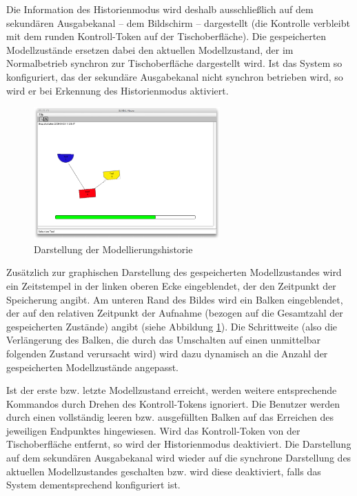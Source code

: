 Die Information des Historienmodus wird deshalb ausschließlich auf dem sekundären Ausgabekanal -- dem Bildschirm -- dargestellt (die Kontrolle verbleibt mit dem runden Kontroll-Token auf der Tischoberfläche). Die gespeicherten Modellzustände ersetzen dabei den aktuellen Modellzustand, der im Normalbetrieb synchron zur Tischoberfläche dargestellt wird. Ist das System so konfiguriert, das der sekundäre Ausgabekanal nicht synchron betrieben wird, so wird er bei Erkennung des Historienmodus aktiviert.

\begin{figure}[htbp]
	\centering
		\includegraphics[height=2in]{img/SystemNeu/HistoryScreen.png}
	\caption{Darstellung der Modellierungshistorie}
	\label{fig:img_SystemNeu_HistoryScreen}
\end{figure}

Zusätzlich zur graphischen Darstellung des gespeicherten Modellzustandes wird ein Zeitstempel in der linken oberen Ecke eingeblendet, der den Zeitpunkt der Speicherung angibt. Am unteren Rand des Bildes wird ein Balken eingeblendet, der auf den relativen Zeitpunkt der Aufnahme (bezogen auf die Gesamtzahl der gespeicherten Zustände) angibt (siehe Abbildung \ref{fig:img_SystemNeu_HistoryScreen}). Die Schrittweite (also die Verlängerung des Balken, die durch das Umschalten auf einen unmittelbar folgenden Zustand verursacht wird) wird dazu dynamisch an die Anzahl der gespeicherten Modellzustände angepasst.

Ist der erste bzw. letzte Modellzustand erreicht, werden weitere entsprechende Kommandos durch Drehen des Kontroll-Tokens ignoriert. Die Benutzer werden durch einen vollständig leeren bzw. ausgefüllten Balken auf das Erreichen des jeweiligen Endpunktes hingewiesen. Wird das Kontroll-Token von der Tischoberfläche entfernt, so wird der Historienmodus deaktiviert. Die Darstellung auf dem sekundären Ausgabekanal wird wieder auf die synchrone Darstellung des aktuellen Modellzustandes geschalten bzw. wird diese deaktiviert, falls das System dementsprechend konfiguriert ist.

